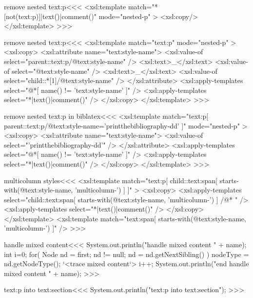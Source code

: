 \documentclass{article}
\begin{document}
\<remove nested text:p\><<<
<xsl:template match="*[not(text:p)]|text()|comment()" mode="nested-p" >
  <xsl:copy/>
</xsl:template> 
>>>

\<remove nested text:p\><<<
<xsl:template match="text:p" mode="nested-p" >
  <xsl:copy>
      <xsl:attribute name="text:style-name">
         <xsl:value-of select="parent::text:p/@text:style-name" />
         <xsl:text>_</xsl:text>
         <xsl:value-of select="@text:style-name" />
         <xsl:text>_</xsl:text>
         <xsl:value-of select="child::*[1]/@text:style-name" />
      </xsl:attribute>      
      <xsl:apply-templates select="@*[ name() != 'text:style-name' ]" />
      <xsl:apply-templates select="*|text()|comment()" />
  </xsl:copy>
</xsl:template> 
>>>

\<remove nested text:p in biblatex\><<<
<xsl:template
    match="text:p[
              parent::text:p/@text:style-name='printthebibliography-dd'
          ]" 
    mode="nested-p" >
  <xsl:copy>
      <xsl:attribute name="text:style-name">
         <xsl:value-of select="'printthebibliography-dd'" />
      </xsl:attribute>      
      <xsl:apply-templates select="@*[ name() != 'text:style-name' ]" />
      <xsl:apply-templates select="*|text()|comment()" />
  </xsl:copy>
</xsl:template> 
>>>












\<multicolumn styles\><<<
<xsl:template match="text:p[  child::text:span[ 
                       starts-with(@text:style-name, 'multicolumn-') 
                     ] ]" >
   <xsl:copy>
       <xsl:apply-templates 
            select="child::text:span[ 
                       starts-with(@text:style-name, 'multicolumn-') ]
                    /@*
                   " />
       <xsl:apply-templates select="*|text()|comment()" />
   </xsl:copy>
</xsl:template> 
<xsl:template match="text:span[ 
                       starts-with(@text:style-name, 'multicolumn-') ]" />
>>>


\<handle mixed content\><<<
System.out.println("handle mixed content " + name);
      int i=0;
      for( Node nd = first; nd != null; nd = nd.getNextSibling() ){ 
        nodeType = nd.getNodeType();
        `<trace mixed content`>
        i++;
      }
System.out.println("end handle mixed content " + name);
>>>

\<text:p into text:section\><<<
System.out.println("text:p into text:section");
>>>
\end{document}
